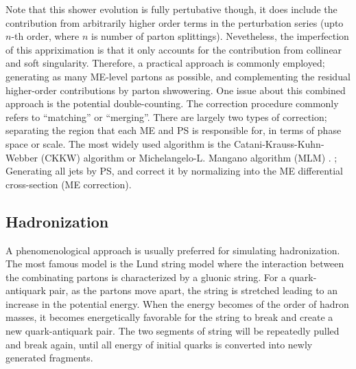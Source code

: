 Note that this shower evolution is fully pertubative though, it does include the contribution from arbitrarily higher order terms in the perturbation series (upto $n$-th order, where $n$ is number of parton splittings). Nevetheless, the imperfection of this appriximation is that it only accounts for the contribution from collinear and soft singularity. 
Therefore, a practical approach is commonly employed; generating as many ME-level partons as possible, and complementing the residual higher-order contributions by parton shwowering.
One issue about this combined approach is the potential double-counting. The correction procedure commonly refers to ``matching'' or ``merging''. There are largely two types of correction; separating the region that each ME and PS is responsible for, in terms of phase space or scale. The most widely used algorithm is the Catani-Krauss-Kuhn-Webber (CKKW) \cite{CKKW_orig} algorithm or Michelangelo-L. Mangano algorithm (MLM) \cite{MLM}. ; Generating all jets by PS, and correct it by normalizing into the ME differential cross-section (ME correction).
\\




\subsection{Hadronization}
A phenomenological approach is usually preferred for simulating hadronization. 
The most famous model is the Lund string model \cite{LundStringModel} where the interaction between the combinating partons is characterized by a gluonic string. 
For a quark-antiquark pair, as the partons move apart, the string is stretched leading to an increase in the potential energy. 
When the energy becomes of the order of hadron masses, it becomes energetically favorable for the string to break and create a new quark-antiquark pair. 
The two segments of string will be repeatedly pulled and break again, until all energy of initial quarks is converted into newly generated fragments. \\ \\ 


